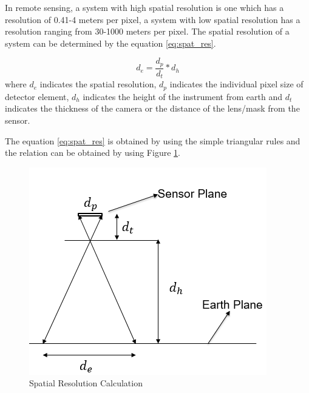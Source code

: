 In remote sensing, a system with high spatial resolution is one which has a resolution of 0.41-4 meters per pixel, a system with low spatial resolution has a resolution ranging from 30-1000 meters per pixel\cite{SpatialResol}. The spatial resolution of a system can be determined by the equation \ref{eq:spat_res}. 

\begin{equation}
\label{eq:spat_res}
d_e = \frac{d_p}{d_t} * d_h
\end{equation}
where $d_e$ indicates the spatial resolution, $d_p$ indicates the individual pixel size of detector element, $d_h$ indicates the height of the instrument from earth and $d_t$ indicates the thickness of the camera or the distance of the lens/mask from the sensor.

The equation \ref{eq:spat_res} is obtained by using the simple triangular rules and the relation can be obtained by using Figure \ref{fig:spatial_resolution_calc}.
\begin{figure}[htb]
\includegraphics[width=\textwidth]{pics/spatialRes}
\caption{Spatial Resolution Calculation}
\label{fig:spatial_resolution_calc}
\end{figure}

